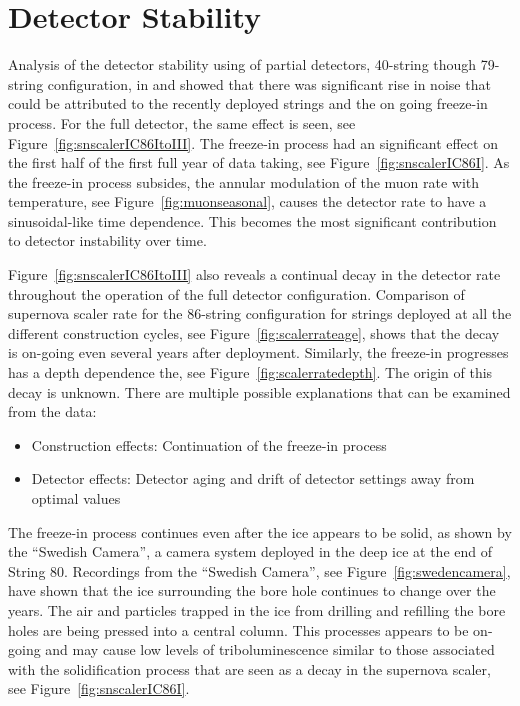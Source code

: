 \section{Detector Stability}

Analysis of the detector stability using of partial detectors, 40-string though 79-string configuration, in \cite{vbaumaster} and \cite{mkrasbergtalk} showed that there was significant rise in noise that could be attributed to the recently deployed strings and the on going freeze-in process. For the full detector, the same effect is seen, see Figure~\ref{fig:snscalerIC86ItoIII}. The freeze-in process had an significant effect on the first half of the first full year of data taking, see Figure~\ref{fig:snscalerIC86I}. As the freeze-in process subsides, the annular modulation of the muon rate with temperature, see Figure~\ref{fig:muonseasonal}, causes the detector rate to have a sinusoidal-like time dependence. This becomes the most significant contribution to detector instability over time. 

\begin{figure}
  
\end{figure}

Figure~\ref{fig:snscalerIC86ItoIII} also reveals a continual decay in the detector rate throughout the operation of the full detector configuration. Comparison of supernova scaler rate for the 86-string configuration for strings deployed at all the different construction cycles, see Figure~\ref{fig:scalerrateage}, shows that the decay is on-going even several years after deployment. Similarly, the freeze-in progresses has a depth dependence the, see Figure~\ref{fig:scalerratedepth}. The origin of this decay is unknown. There are multiple possible explanations that can be examined from the data:

\begin{itemize}
  \item Construction effects: Continuation of the freeze-in process
  \item Detector effects: Detector aging and drift of detector settings away from optimal values
\end{itemize}

The freeze-in process continues even after the ice appears to be solid, as shown by the ``Swedish Camera'', a camera system deployed in the deep ice at the end of String 80. Recordings from the ``Swedish Camera'', see Figure~\ref{fig:swedencamera}, have shown that the ice surrounding the bore hole continues to change over the years. The air and particles trapped in the ice from drilling and refilling the bore holes are being pressed into a central column. This processes appears to be on-going and may cause low levels of triboluminescence similar to those associated with the solidification process that are seen as a decay in the supernova scaler, see Figure~\ref{fig:snscalerIC86I}. 

